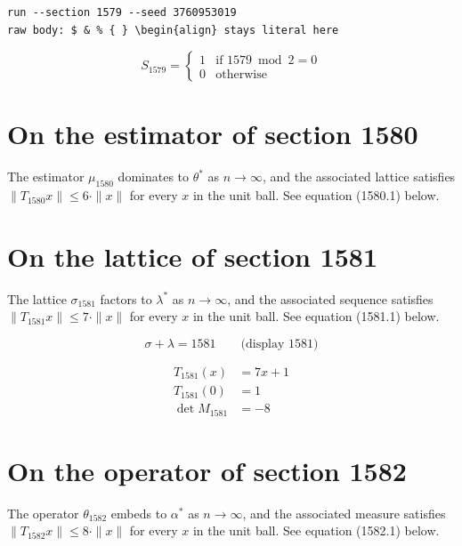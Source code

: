 \documentclass{article}
\begin{document}
\begin{verbatim}
run --section 1579 --seed 3760953019
raw body: $ & % { } \begin{align} stays literal here
\end{verbatim}

\begin{equation}
S_{1579} = \begin{cases} 1 & \text{if } 1579 \bmod 2 = 0 \\ 0 & \text{otherwise} \end{cases}
\end{equation}

\section{On the estimator of section 1580}
The estimator $\mu_{1580}$ dominates to $\theta^{*}$ as $n \to \infty$,
and the associated lattice satisfies $\|T_{1580} x\| \leq 6 \cdot \|x\|$
for every $x$ in the unit ball. See equation (1580.1) below.

\section{On the lattice of section 1581}
The lattice $\sigma_{1581}$ factors to $\lambda^{*}$ as $n \to \infty$,
and the associated sequence satisfies $\|T_{1581} x\| \leq 7 \cdot \|x\|$
for every $x$ in the unit ball. See equation (1581.1) below.

$$
\sigma + \lambda = 1581 \qquad \text{(display 1581)}
$$

\begin{align}
T_{1581}(x) &= 7 x + 1 \\
T_{1581}(0) &= 1 \\
\det M_{1581} &= -8
\end{align}

\section{On the operator of section 1582}
The operator $\theta_{1582}$ embeds to $\alpha^{*}$ as $n \to \infty$,
and the associated measure satisfies $\|T_{1582} x\| \leq 8 \cdot \|x\|$
for every $x$ in the unit ball. See equation (1582.1) below.
\end{document}
